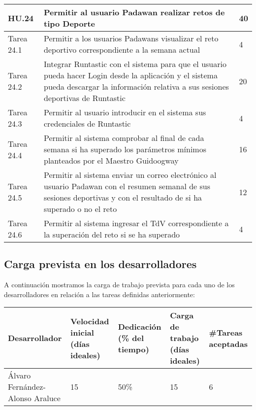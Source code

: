 \begin{table}[h]
	\centering
	\begin{tabular}{| p{2.3cm} | p{6.7cm} | p{2cm} |}
		\rowcolor[HTML]{329A9D} 
		{\color[HTML]{FFFFFF} \textbf{HU.24}} & {\color[HTML]{FFFFFF} \textbf{Permitir al usuario Padawan realizar retos de tipo Deporte}} & {\color[HTML]{FFFFFF} \textbf{40}}  \\ \hline
		Tarea 24.1 & Permitir a los usuarios Padawans visualizar el reto deportivo correspondiente a la semana actual & 4 \\ \hline
		Tarea 24.2 & Integrar Runtastic con el sistema para que el usuario pueda hacer Login desde la aplicación y el sistema pueda descargar la información relativa a sus sesiones deportivas de Runtastic & 20 \\ \hline
		Tarea 24.3 & Permitir al usuario introducir en el sistema sus credenciales de Runtastic & 4 \\ \hline
		Tarea 24.4 & Permitir al sistema comprobar al final de cada semana si ha superado los parámetros mínimos planteados por el Maestro Guidoogway & 16 \\ \hline
		Tarea 24.5 & Permitir al sistema enviar un correo electrónico al usuario Padawan con el resumen semanal de sus sesiones deportivas y con el resultado de si ha superado o no el reto & 12 \\ \hline
		Tarea 24.6 & Permitir al sistema ingresar el TdV correspondiente a la superación del reto si se ha superado & 4 \\ \hline
	\end{tabular}
\end{table}

\newpage

\subsection{Carga prevista en los desarrolladores}

A continuación mostramos la carga de trabajo prevista para cada uno de los desarrolladores en relación a las tareas definidas anteriormente:

\begin{table}[h]
	\centering
	\begin{tabular}{| p{3cm} | p{2cm} | p{2cm} | p{2cm} | p{2cm} |}
		\rowcolor[HTML]{329A9D} 
		{\color[HTML]{FFFFFF} \textbf{Desarrollador}} & {\color[HTML]{FFFFFF} \textbf{Velocidad inicial (días ideales)}} & {\color[HTML]{FFFFFF} \textbf{Dedicación (\% del tiempo)}} & {\color[HTML]{FFFFFF} \textbf{Carga de trabajo (días ideales)}} & {\color[HTML]{FFFFFF} \textbf{\#Tareas aceptadas}}  \\ \hline
		Álvaro Fernández-Alonso Araluce & 15 & 50\% & 15 & 6 \\ \hline
	\end{tabular}
\end{table}


